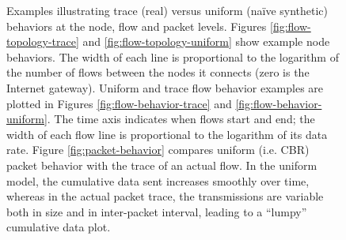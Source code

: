 \documentclass[conference]{IEEEtran}
\newcommand{\FHC}{Hern\'andez-Campos~\textit{et~al.}}
\newcommand{\class}[1]{\textsc{\small{#1}}}
\begin{document}

\begin{figure}[tb]
\begin{center}
\caption{Examples illustrating trace (real) versus uniform (na\"ive synthetic) behaviors at the node, flow and packet levels. Figures \ref{fig:flow-topology-trace} and \ref{fig:flow-topology-uniform} show example node behaviors. The width of each line is proportional to the logarithm of the number of flows between the nodes it connects (zero is the Internet gateway). Uniform and trace flow behavior examples are plotted in Figures \ref{fig:flow-behavior-trace} and \ref{fig:flow-behavior-uniform}. The time axis indicates when flows start and end; the width of each flow line is proportional to the logarithm of its data rate. Figure \ref{fig:packet-behavior} compares uniform (i.e. {\footnotesize{CBR}}) packet behavior with the trace of an actual flow. In the uniform model, the cumulative data sent increases smoothly over time, whereas in the actual packet trace, the transmissions are variable both in size and in inter-packet interval, leading to a ``lumpy'' cumulative data plot.}
\label{fig:trace-vs-uniform}
\end{center}
\vspace{-2em}
\end{figure}
\end{document}
